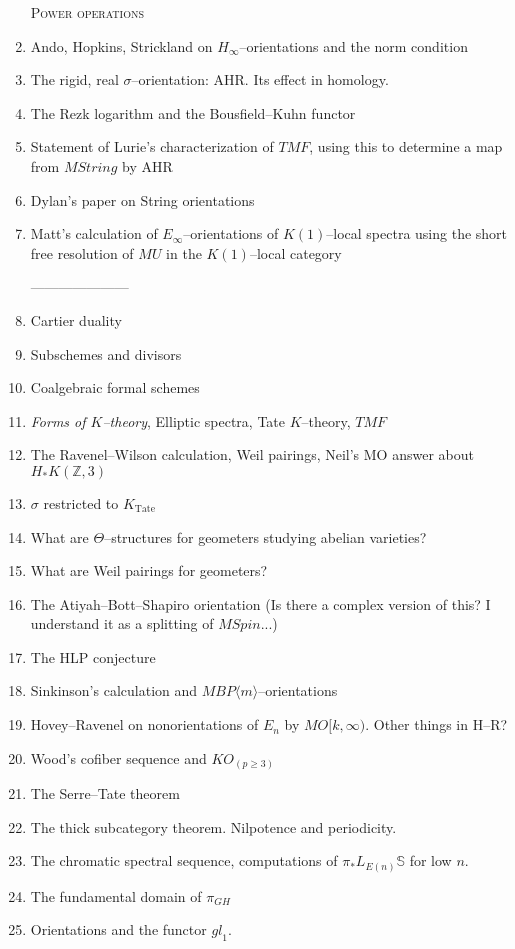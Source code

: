 \documentclass{article}
\newcommand{\Z}{\mathbb Z}
\renewcommand{\S}{\mathbb S}
\newcommand{\<}{\langle}
\renewcommand{\>}{\rangle}
\newcommand{\Spin}{\mathit{Spin}}
\newcommand{\String}{\mathit{String}}
\newcommand{\TMF}{\mathit{TMF}}
\newcommand{\BP}{\mathit{BP}}
\newcommand{\Tate}{\mathrm{Tate}}
\newcommand{\gl}{\mathit{gl}}
\numberwithin{equation}{section}
\theoremstyle{plain}
\theoremstyle{definition}
\theoremstyle{remark}
\begin{document}
\begin{enumerate}
\textsc{Power operations}

\item Ando, Hopkins, Strickland on $H_\infty$--orientations and the norm condition
\item The rigid, real $\sigma$--orientation: AHR. Its effect in homology.
\item The Rezk logarithm and the Bousfield--Kuhn functor
\item Statement of Lurie's characterization of $\TMF$, using this to determine a map from $M\String$ by AHR
\item Dylan's paper on String orientations
\item Matt's calculation of $E_\infty$--orientations of $K(1)$--local spectra using the short free resolution of $MU$ in the $K(1)$--local category

---------------------
\item Cartier duality
\item Subschemes and divisors
\item Coalgebraic formal schemes
\item \textit{Forms of $K$--theory}, Elliptic spectra, Tate $K$--theory, $\TMF$
\item The Ravenel--Wilson calculation, Weil pairings, Neil's MO answer about $H_* K(\Z, 3)$
\item $\sigma$ restricted to $K_{\Tate}$
\item What are $\Theta$--structures for geometers studying abelian varieties?
\item What are Weil pairings for geometers?
\item The Atiyah--Bott--Shapiro orientation (Is there a complex version of this? I understand it as a splitting of $M\Spin$...)
\item The HLP conjecture
\item Sinkinson's calculation and $M\BP\<m\>$--orientations
\item Hovey--Ravenel on nonorientations of $E_n$ by $MO[k, \infty)$. Other things in H--R?
\item Wood's cofiber sequence and $KO_{(p \ge 3)}$
\item The Serre--Tate theorem
\item The thick subcategory theorem.  Nilpotence and periodicity.
\item The chromatic spectral sequence, computations of $\pi_* L_{E(n)} \S$ for low $n$.
\item The fundamental domain of $\pi_{GH}$
\item Orientations and the functor $\gl_1$.
\end{enumerate}
\end{document}
